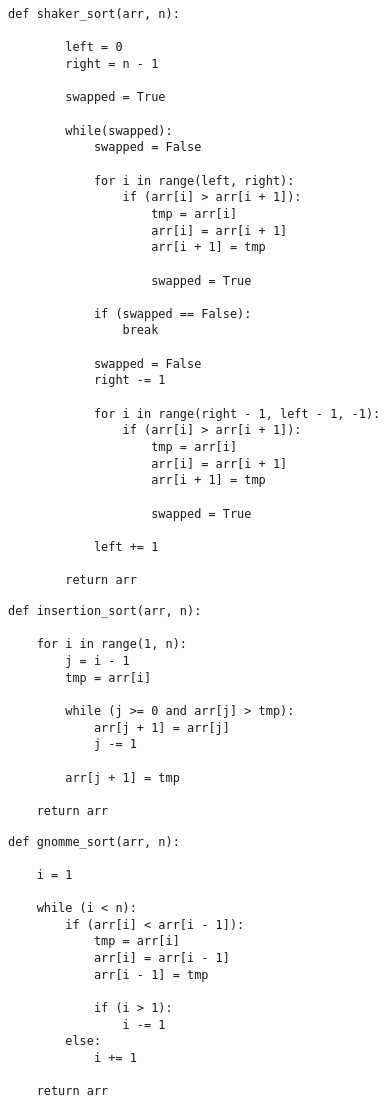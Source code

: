 \begin{center}
    \captionsetup{justification=raggedright,singlelinecheck=off}
    \begin{lstlisting}[label=lst:shaker_sort,caption=Алгоритм сортировки перемешиванием]
        def shaker_sort(arr, n):
    
        left = 0
        right = n - 1
    
        swapped = True
    
        while(swapped):
            swapped = False
    
            for i in range(left, right):
                if (arr[i] > arr[i + 1]):
                    tmp = arr[i]
                    arr[i] = arr[i + 1]
                    arr[i + 1] = tmp
    
                    swapped = True
    
            if (swapped == False):
                break
    
            swapped = False
            right -= 1
    
            for i in range(right - 1, left - 1, -1):
                if (arr[i] > arr[i + 1]):
                    tmp = arr[i]
                    arr[i] = arr[i + 1]
                    arr[i + 1] = tmp
    
                    swapped = True
    
            left += 1
    
        return arr
\end{lstlisting}
\end{center}

\clearpage

\begin{center}
\captionsetup{justification=raggedright,singlelinecheck=off}
\begin{lstlisting}[label=lst:insert_sort,caption=Алгоритм сортировки вставками]
    def insertion_sort(arr, n):

    for i in range(1, n):
        j = i - 1
        tmp = arr[i]

        while (j >= 0 and arr[j] > tmp):
            arr[j + 1] = arr[j]
            j -= 1

        arr[j + 1] = tmp

    return arr
\end{lstlisting}
\end{center}


\begin{center}
\captionsetup{justification=raggedright,singlelinecheck=off}
\begin{lstlisting}[label=lst:gnomme_sort,caption=Алгоритм гномьей сортировки]
    def gnomme_sort(arr, n):
    
    i = 1

    while (i < n):
        if (arr[i] < arr[i - 1]):
            tmp = arr[i]
            arr[i] = arr[i - 1]
            arr[i - 1] = tmp

            if (i > 1):
                i -= 1
        else:
            i += 1

    return arr
\end{lstlisting}
\end{center}

